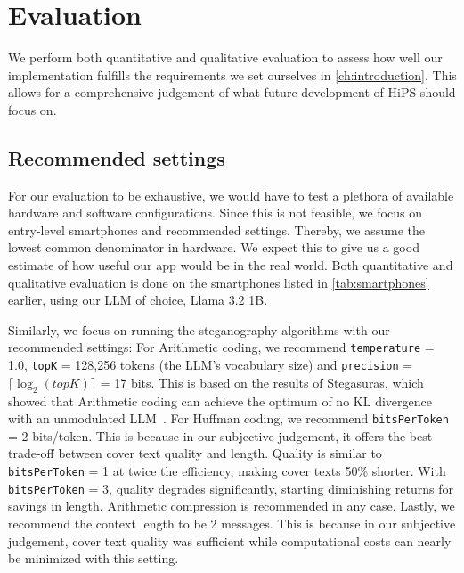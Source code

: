 
\chapter{Evaluation}\label{ch:evaluation}
\glsresetall %

We perform both quantitative and qualitative evaluation to assess how well our implementation fulfills the requirements we set ourselves in \cref{ch:introduction}. This allows for a comprehensive judgement of what future development of \gls{HiPS} should focus on.

\section{Recommended settings}
\label{sec:recommendedSettings}
For our evaluation to be exhaustive, we would have to test a plethora of available hardware and software configurations. Since this is not feasible, we focus on entry-level smartphones and recommended settings. Thereby, we assume the lowest common denominator in hardware. We expect this to give us a good estimate of how useful our app would be in the real world. Both quantitative and qualitative evaluation is done on the smartphones listed in \cref{tab:smartphones} earlier, using our \gls{LLM} of choice, Llama 3.2 1B.

Similarly, we focus on running the steganography algorithms with our recommended settings: For Arithmetic coding, we recommend \lstinline|temperature| = 1.0, \lstinline|topK| = 128,256 tokens (the \gls{LLM}'s vocabulary size) and \lstinline|precision| = $ \lceil \log_2(topK) \rceil $ = 17 bits. This is based on the results of Stegasuras, which showed that Arithmetic coding can achieve the optimum of no \gls{KL} divergence with an unmodulated \gls{LLM}~\cite{zieglerNeuralLinguisticSteganography2019}. For Huffman coding, we recommend \lstinline|bitsPerToken| = 2 bits/token. This is because in our subjective judgement, it offers the best trade-off between cover text quality and length. Quality is similar to \lstinline|bitsPerToken| = 1 at twice the efficiency, making cover texts 50\% shorter. With \lstinline|bitsPerToken| = 3, quality degrades significantly, starting diminishing returns for savings in length. Arithmetic compression is recommended in any case. Lastly, we recommend the context length to be 2 messages. This is because in our subjective judgement, cover text quality was sufficient while computational costs can nearly be minimized with this setting.

